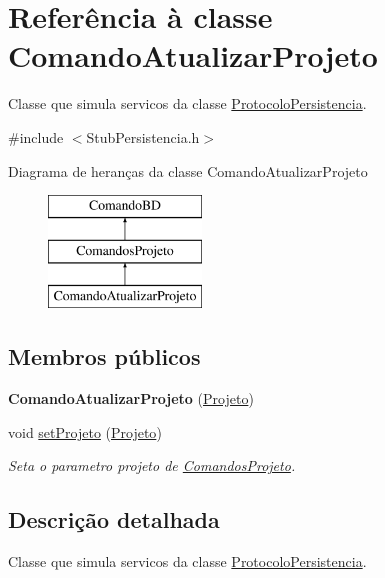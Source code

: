 \hypertarget{class_comando_atualizar_projeto}{
\section{\-Referência à classe \-Comando\-Atualizar\-Projeto}
\label{class_comando_atualizar_projeto}
}


\-Classe que simula servicos da classe \hyperlink{class_protocolo_persistencia}{\-Protocolo\-Persistencia}.  




{\ttfamily \#include $<$\-Stub\-Persistencia.\-h$>$}

\-Diagrama de heranças da classe \-Comando\-Atualizar\-Projeto\begin{figure}[H]
\begin{center}
\leavevmode
\includegraphics[height=3.000000cm]{class_comando_atualizar_projeto}
\end{center}
\end{figure}
\subsection*{\-Membros públicos}
\begin{DoxyCompactItemize}
\item 
\hypertarget{class_comando_atualizar_projeto_a22474107bdd804e582b078d5a415c3f0}{
{\bfseries \-Comando\-Atualizar\-Projeto} (\hyperlink{class_projeto}{\-Projeto})}
\label{class_comando_atualizar_projeto_a22474107bdd804e582b078d5a415c3f0}

\item 
void \hyperlink{class_comando_atualizar_projeto_abbcfadfce2d9ac9f0e1bc1f85323382d}{set\-Projeto} (\hyperlink{class_projeto}{\-Projeto})
\begin{DoxyCompactList}\small\item\em \-Seta o parametro projeto de \hyperlink{class_comandos_projeto}{\-Comandos\-Projeto}. \end{DoxyCompactList}\end{DoxyCompactItemize}


\subsection{\-Descrição detalhada}
\-Classe que simula servicos da classe \hyperlink{class_protocolo_persistencia}{\-Protocolo\-Persistencia}. 

